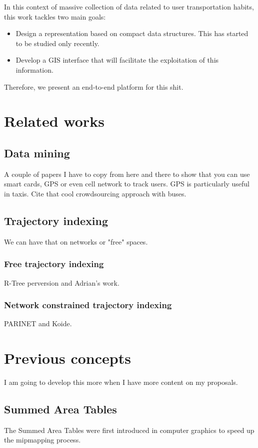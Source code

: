 \documentclass{UniVieCS_PhD} %
\begin{document}
	In this context of massive collection of data related to user transportation habits, this work tackles two main goals:
	
	\begin{itemize}
	    \item Design a representation based on compact data structures. This has started to be studied only recently.
	    \item Develop a GIS interface that will facilitate the exploitation of this information.
	\end{itemize}
	
	Therefore, we present an end-to-end platform for this shit.
	
	\section{Related works}
	\subsection{Data mining}
	A couple of papers I have to copy from here and there to show that you can use smart cards, GPS or even cell network to track users. GPS is particularly useful in taxis. Cite that cool crowdsourcing approach with buses.
	
	\subsection{Trajectory indexing}
	We can have that on networks or "free" spaces.
	
	\subsubsection{Free trajectory indexing}
	R-Tree perversion and Adrian's work.
	
	\subsubsection{Network constrained trajectory indexing}
	PARINET and Koide.
	
	\section{Previous concepts}
	I am going to develop this more when I have more content on my proposals.
	
	\subsection{Summed Area Tables}
	The Summed Area Tables were first introduced in computer graphics \cite{crow1984summed} to speed up the mipmapping process.
	
\end{document}
